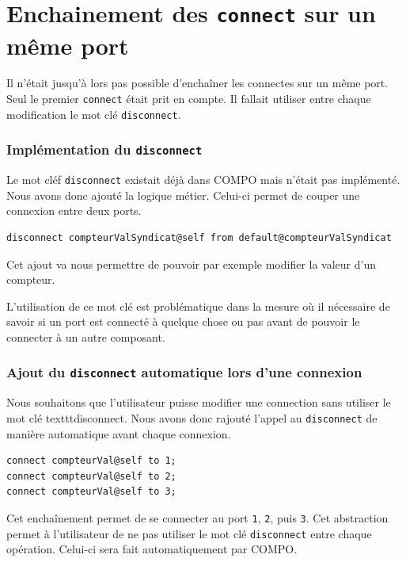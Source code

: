\documentclass[11pt,a4paper,openany,oneside]{book}
\begin{document}
\section{Enchainement des \texttt{connect} sur un même port}

Il n'était jusqu'à lors pas possible d'enchaîner les connectes sur un même port. Seul le premier \texttt{connect} était prit en compte. Il fallait utiliser entre chaque modification le mot clé \texttt{disconnect}.


\subsubsection{Implémentation du \texttt{disconnect}}

Le mot cléf \texttt{disconnect} existait déjà dans COMPO mais n'était pas implémenté. Nous avons donc ajouté la logique métier. Celui-ci permet de couper une connexion entre deux ports.

\begin{lstlisting}[language=Compo, frame=single, caption=Syntaxe d'une déconnexion]
disconnect compteurValSyndicat@self from default@compteurValSyndicat
\end{lstlisting}

Cet ajout va nous permettre de pouvoir par exemple modifier la valeur d'un compteur.

L'utilisation de ce mot clé est problématique dans la mesure où il nécessaire de savoir si un port est connecté à quelque chose ou pas avant de pouvoir le connecter à un autre composant. 

\subsubsection{Ajout du \texttt{disconnect} automatique lors d'une connexion}

Nous souhaitons que l'utilisateur puisse modifier une connection sans utiliser le mot clé texttt{disconnect}. Nous avons donc rajouté l'appel au \texttt{disconnect} de manière automatique avant chaque connexion.

\begin{lstlisting}[language=Compo, frame=single, caption=Syntaxe d'une connexion entre un port et un littéral]
connect compteurVal@self to 1;
connect compteurVal@self to 2;
connect compteurVal@self to 3;
\end{lstlisting}

Cet enchaînement permet de se connecter au port \texttt{1}, \texttt{2}, puis \texttt{3}. Cet abstraction permet à l'utilisateur de ne pas utiliser le mot clé \texttt{disconnect} entre chaque opération. Celui-ci sera fait automatiquement par COMPO. 
\end{document}
